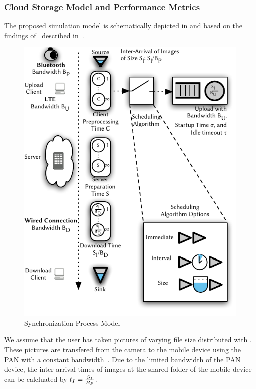 \subsubsection*{Cloud Storage Model and Performance Metrics}\label{sec:application:cloud_file_synchronisation:system_model:model_metrics}
The proposed simulation model is schematically depicted in  and based on the findings of~\cite{drago2012} described in~.

\begin{figure}
\centering
\includegraphics[width=\columnwidth]{application/cloud_file_synchronization/system_model/figures/model}
\caption{Synchronization Process Model}
\label{fig:application:cloud_file_synchronisation:system_model:model_metrics:model}
\end{figure}

We assume that the user has taken pictures of varying file size distributed with \imageFileSize.
These pictures are transfered from the camera to the mobile device using the \gls{PAN} with a constant bandwidth~\panTransferRate.
Due to the limited bandwidth \panTransferRate of the \gls{PAN} device, the inter-arrival times of images at the \dropbox shared folder of the mobile device can be calcluated by \(t_I = \frac{S_I}{B_{P}}\).

